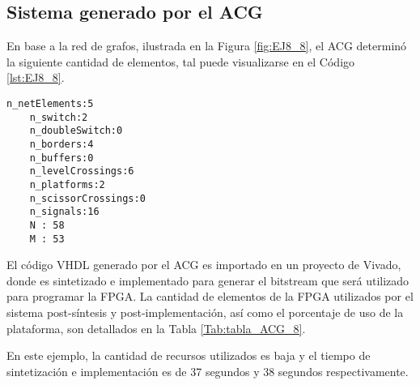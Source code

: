 \subsection{Sistema generado por el ACG}

	En base a la red de grafos, ilustrada en la Figura \ref{fig:EJ8_8}, el ACG determinó la siguiente cantidad de elementos, tal puede visualizarse en el Código \ref{lst:EJ8_8}.
	
	\begin{lstlisting}[language = {}, caption = Cantidad de elementos a implementar por el ACG, label = {lst:EJ8_8}]
	n_netElements:5
	n_switch:2
	n_doubleSwitch:0
	n_borders:4
	n_buffers:0
	n_levelCrossings:6
	n_platforms:2
	n_scissorCrossings:0
	n_signals:16
	N : 58
	M : 53
	\end{lstlisting}
	
	El código VHDL generado por el ACG es importado en un proyecto de Vivado, donde es sintetizado e implementado para generar el bitstream que será utilizado para programar la FPGA. La cantidad de elementos de la FPGA utilizados por el sistema post-síntesis y post-implementación, así como el porcentaje de uso de la plataforma, son detallados en la Tabla \ref{Tab:tabla_ACG_8}.
	
	\begin{table}[H]
		{
			\caption{Síntesis e implementación del ejemplo 8 generado por el ACG.}
			\label{Tab:tabla_ACG_8}
			\centering
			\begin{center}
			\end{center}
		}    
	\end{table}
	
	En este ejemplo, la cantidad de recursos utilizados es baja y el tiempo de sintetización e implementación es de 37 segundos y 38 segundos respectivamente.